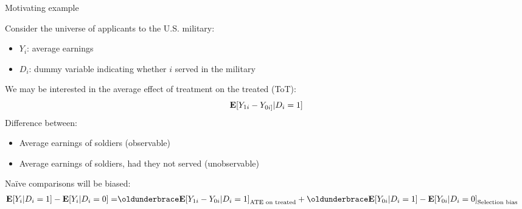 \documentclass[compress, 8pt]{beamer}
\begin{document}


\begin{frame}{Motivating example}

Consider the universe of applicants to the U.S. military:
\begin{itemize}
    \item $Y_i$: average earnings
    \item $D_i$: dummy variable indicating whether $i$ served in the military
\end{itemize}
We may be interested in the average effect of treatment on the treated (ToT):
\begin{equation*}
    \mathbf{E} [Y_{1i} - Y_{0i]} \vert D_i = 1]
\end{equation*}
Difference between:
\begin{itemize}
    \item Average earnings of soldiers (observable)
    \item Average earnings of soldiers, had they not served (unobservable)
\end{itemize}
Na{\"i}ve comparisons will be biased:
\begin{align*}
\EE [Y_i \vert D_i = 1] - \EE [Y_i \vert D_i=0] 
=& \underbrace{\EE [Y_{1i} - Y_{0i} \vert D_i = 1]}_{\text{ATE on treated}} 
+ \underbrace{\EE [Y_{0i} \vert D_i = 1] - \EE [Y_{0i} \vert D_i=0]}_{\text{Selection bias}}
\end{align*}

\end{frame}
\end{document}
